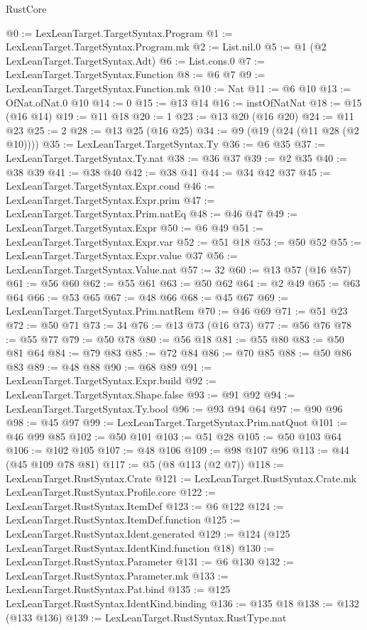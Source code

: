 \begin{lexlean}{RustCore}
\begin{coremodule}
@0 := LexLeanTarget.TargetSyntax.Program
@1 := LexLeanTarget.TargetSyntax.Program.mk
@2 := List.nil.{0}
@5 := @1 (@2 LexLeanTarget.TargetSyntax.Adt)
@6 := List.cons.{0}
@7 := LexLeanTarget.TargetSyntax.Function
@8 := @6 @7
@9 := LexLeanTarget.TargetSyntax.Function.mk
@10 := Nat
@11 := @6 @10
@13 := OfNat.ofNat.{0} @10
@14 := 0
@15 := @13 @14
@16 := instOfNatNat
@18 := @15 (@16 @14)
@19 := @11 @18
@20 := 1
@23 := @13 @20 (@16 @20)
@24 := @11 @23
@25 := 2
@28 := @13 @25 (@16 @25)
@34 := @9 (@19 (@24 (@11 @28 (@2 @10))))
@35 := LexLeanTarget.TargetSyntax.Ty
@36 := @6 @35
@37 := LexLeanTarget.TargetSyntax.Ty.nat
@38 := @36 @37
@39 := @2 @35
@40 := @38 @39
@41 := @38 @40
@42 := @38 @41
@44 := @34 @42 @37
@45 := LexLeanTarget.TargetSyntax.Expr.cond
@46 := LexLeanTarget.TargetSyntax.Expr.prim
@47 := LexLeanTarget.TargetSyntax.Prim.natEq
@48 := @46 @47
@49 := LexLeanTarget.TargetSyntax.Expr
@50 := @6 @49
@51 := LexLeanTarget.TargetSyntax.Expr.var
@52 := @51 @18
@53 := @50 @52
@55 := LexLeanTarget.TargetSyntax.Expr.value @37
@56 := LexLeanTarget.TargetSyntax.Value.nat
@57 := 32
@60 := @13 @57 (@16 @57)
@61 := @56 @60
@62 := @55 @61
@63 := @50 @62
@64 := @2 @49
@65 := @63 @64
@66 := @53 @65
@67 := @48 @66
@68 := @45 @67
@69 := LexLeanTarget.TargetSyntax.Prim.natRem
@70 := @46 @69
@71 := @51 @23
@72 := @50 @71
@73 := 34
@76 := @13 @73 (@16 @73)
@77 := @56 @76
@78 := @55 @77
@79 := @50 @78
@80 := @56 @18
@81 := @55 @80
@83 := @50 @81 @64
@84 := @79 @83
@85 := @72 @84
@86 := @70 @85
@88 := @50 @86 @83
@89 := @48 @88
@90 := @68 @89
@91 := LexLeanTarget.TargetSyntax.Expr.build
@92 := LexLeanTarget.TargetSyntax.Shape.false
@93 := @91 @92
@94 := LexLeanTarget.TargetSyntax.Ty.bool
@96 := @93 @94 @64
@97 := @90 @96
@98 := @45 @97
@99 := LexLeanTarget.TargetSyntax.Prim.natQuot
@101 := @46 @99 @85
@102 := @50 @101
@103 := @51 @28
@105 := @50 @103 @64
@106 := @102 @105
@107 := @48 @106
@109 := @98 @107 @96
@113 := @44 (@45 @109 @78 @81)
@117 := @5 (@8 @113 (@2 @7))
@118 := LexLeanTarget.RustSyntax.Crate
@121 := LexLeanTarget.RustSyntax.Crate.mk LexLeanTarget.RustSyntax.Profile.core
@122 := LexLeanTarget.RustSyntax.ItemDef
@123 := @6 @122
@124 := LexLeanTarget.RustSyntax.ItemDef.function
@125 := LexLeanTarget.RustSyntax.Ident.generated
@129 := @124 (@125 LexLeanTarget.RustSyntax.IdentKind.function @18)
@130 := LexLeanTarget.RustSyntax.Parameter
@131 := @6 @130
@132 := LexLeanTarget.RustSyntax.Parameter.mk
@133 := LexLeanTarget.RustSyntax.Pat.bind
@135 := @125 LexLeanTarget.RustSyntax.IdentKind.binding
@136 := @135 @18
@138 := @132 (@133 @136)
@139 := LexLeanTarget.RustSyntax.RustType.nat

\end{coremodule}
\end{lexlean}
